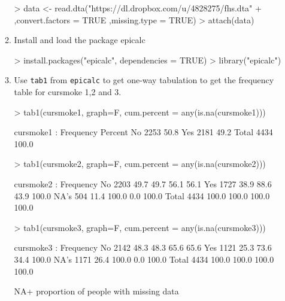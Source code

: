 \documentclass{article}
\begin{document}
\begin{enumerate}
\begin{enumerate}
\begin{Schunk}
\begin{Sinput}
> data <- read.dta("https://dl.dropbox.com/u/4828275/fhs.dta"
+                  ,convert.factors = TRUE ,missing.type = TRUE)
> attach(data)
\end{Sinput}
\end{Schunk}
\item Install and load the package epicalc
\begin{Schunk}
\begin{Sinput}
> install.packages("epicalc", dependencies = TRUE)
> library("epicalc")
\end{Sinput}
\end{Schunk}
\item Use \texttt{tab1} from \texttt{epicalc} to get one-way tabulation to get the frequency table for cursmoke 1,2 and 3.\\

\begin{Schunk}
\begin{Sinput}
> tab1(cursmoke1, graph=F, cum.percent = any(is.na(cursmoke1)))
\end{Sinput}
\begin{Soutput}
cursmoke1 : 
        Frequency Percent
No           2253    50.8
Yes          2181    49.2
  Total      4434   100.0
\end{Soutput}
\begin{Sinput}
> tab1(cursmoke2, graph=F, cum.percent = any(is.na(cursmoke2)))
\end{Sinput}
\begin{Soutput}
cursmoke2 : 
        Frequency   %(NA+) cum.%(NA+)   %(NA-) cum.%(NA-)
No           2203     49.7       49.7     56.1       56.1
Yes          1727     38.9       88.6     43.9      100.0
NA's          504     11.4      100.0      0.0      100.0
  Total      4434    100.0      100.0    100.0      100.0
\end{Soutput}
\begin{Sinput}
> tab1(cursmoke3, graph=F, cum.percent = any(is.na(cursmoke3)))
\end{Sinput}
\begin{Soutput}
cursmoke3 : 
        Frequency   %(NA+) cum.%(NA+)   %(NA-) cum.%(NA-)
No           2142     48.3       48.3     65.6       65.6
Yes          1121     25.3       73.6     34.4      100.0
NA's         1171     26.4      100.0      0.0      100.0
  Total      4434    100.0      100.0    100.0      100.0
\end{Soutput}
\end{Schunk}
NA+ proportion of people with missing data\\

\end{enumerate}
\end{enumerate}
\end{document}
